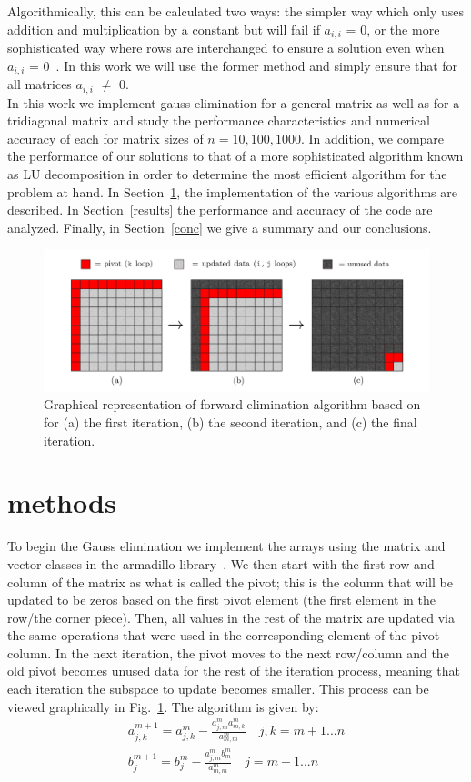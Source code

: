 \documentclass[prc,amsmath,twocolumn,superscriptaddress]{revtex4}
\begin{document}
Algorithmically, this can be calculated two ways: the simpler way which only uses addition and multiplication by a constant but will fail if $a_{i,i}$ = 0, or the more sophisticated way where rows are interchanged to ensure a solution even when $a_{i,i}$ = 0~\cite{book}. In this work we will use the former method and simply ensure that for all matrices $a_{i,i}$ $\neq$ 0. \\

In this work we implement gauss elimination for a general matrix as well as for a tridiagonal matrix and study the performance characteristics and numerical accuracy of each for matrix sizes of $n=10,100,1000$. In addition, we compare the performance of our solutions to that of a more sophisticated algorithm known as LU decomposition in order to determine the most efficient algorithm for the problem at hand. In Section~\ref{methods}, the implementation of the various algorithms are described. In Section~\ref{results} the performance and accuracy of the code are analyzed. Finally, in Section~\ref{conc} we give a summary and our conclusions.

\begin{figure}[t]
\includegraphics[scale=0.2]{algorithm.jpg}
\caption{Graphical representation of forward elimination algorithm based on~\cite{graph} for (a) the first iteration, (b) the second iteration, and (c) the final iteration.}
\label{algorithm}
\end{figure}

\section{methods}
\label{methods}
To begin the Gauss elimination we implement the arrays using the matrix and vector classes in the armadillo library~\cite{armadillo}. We then start with the first row and column of the matrix as what is called the pivot; this is the column that will be updated to be zeros based on the first pivot element (the first element in the row/the corner piece). Then, all values in the rest of the matrix are updated via the same operations that were used in the corresponding element of the pivot column. In the next iteration, the pivot moves to the next row/column and the old pivot becomes unused data for the rest of the iteration process, meaning that each iteration the subspace to update becomes smaller. This process can be viewed graphically in Fig.~\ref{algorithm}. The algorithm is given by:
\begin{gather}
a_{j,k}^{m+1}=a_{j,k}^{m}-\frac{a_{j,m}^{m}a_{m,k}^{m}}{a_{m,m}^m} \quad j,k=m+1...n\\
b_j^{m+1}=b_j^m-\frac{a_{j,m}^m b_m^m}{a_{m,m}^m} \quad j=m+1...n 
\end{gather}
\end{document}
